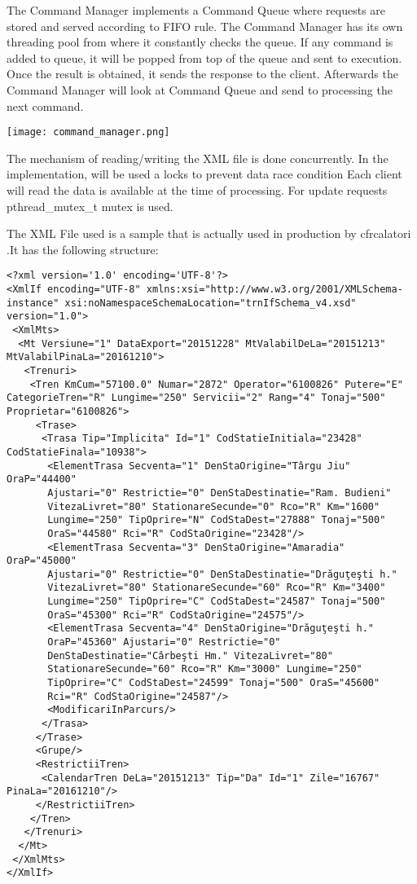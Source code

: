 \documentclass[runningheads]{llncs}
\begin{document}
The Command Manager implements a Command Queue where requests are stored and served according to FIFO rule. The Command Manager has its own threading pool from where it constantly checks the queue. If any command is added to queue, it will be popped from top of the queue and sent to execution. Once the result is obtained, it sends the response to the client. Afterwards the Command Manager will look at Command Queue and send to processing the next command.

\hspace{+1in}
\texttt{[image: command\_manager.png]}


The mechanism of reading/writing the XML file is done concurrently. In the implementation, will be used a locks to prevent data race condition\cite{ref_url2} Each client will read the data is available at the time of processing. For update requests pthread\_mutex\_t mutex is used.

The XML File used is a sample that is actually used in production by cfrcalatori \cite{datagov}.It has the following structure:

\begin{lstlisting}
<?xml version='1.0' encoding='UTF-8'?>
<XmlIf encoding="UTF-8" xmlns:xsi="http://www.w3.org/2001/XMLSchema-instance" xsi:noNamespaceSchemaLocation="trnIfSchema_v4.xsd" version="1.0">
 <XmlMts>
  <Mt Versiune="1" DataExport="20151228" MtValabilDeLa="20151213" MtValabilPinaLa="20161210">
   <Trenuri>
    <Tren KmCum="57100.0" Numar="2872" Operator="6100826" Putere="E" CategorieTren="R" Lungime="250" Servicii="2" Rang="4" Tonaj="500" Proprietar="6100826">
     <Trase>
      <Trasa Tip="Implicita" Id="1" CodStatieInitiala="23428" CodStatieFinala="10938">
       <ElementTrasa Secventa="1" DenStaOrigine="Târgu Jiu" OraP="44400" 
       Ajustari="0" Restrictie="0" DenStaDestinatie="Ram. Budieni" 
       VitezaLivret="80" StationareSecunde="0" Rco="R" Km="1600" 
       Lungime="250" TipOprire="N" CodStaDest="27888" Tonaj="500" 
       OraS="44580" Rci="R" CodStaOrigine="23428"/>
       <ElementTrasa Secventa="3" DenStaOrigine="Amaradia" OraP="45000"
       Ajustari="0" Restrictie="0" DenStaDestinatie="Drăguţeşti h."
       VitezaLivret="80" StationareSecunde="60" Rco="R" Km="3400"
       Lungime="250" TipOprire="C" CodStaDest="24587" Tonaj="500"
       OraS="45300" Rci="R" CodStaOrigine="24575"/>
       <ElementTrasa Secventa="4" DenStaOrigine="Drăguţeşti h."
       OraP="45360" Ajustari="0" Restrictie="0"
       DenStaDestinatie="Cârbeşti Hm." VitezaLivret="80"
       StationareSecunde="60" Rco="R" Km="3000" Lungime="250"
       TipOprire="C" CodStaDest="24599" Tonaj="500" OraS="45600"
       Rci="R" CodStaOrigine="24587"/>
       <ModificariInParcurs/>
      </Trasa>
     </Trase>
     <Grupe/>
     <RestrictiiTren>
      <CalendarTren DeLa="20151213" Tip="Da" Id="1" Zile="16767" PinaLa="20161210"/>
     </RestrictiiTren>
    </Tren>
   </Trenuri>
  </Mt>
 </XmlMts>
</XmlIf>
\end{lstlisting}
\end{document}
